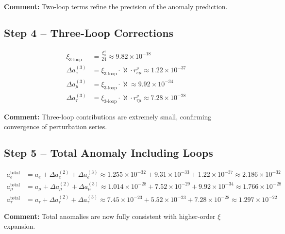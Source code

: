 \documentclass[12pt,a4paper]{article}
\begin{document}
\textbf{Comment:} Two-loop terms refine the precision of the anomaly prediction.

\subsection{Step 4 – Three-Loop Corrections}

\begin{align}
	\xi_\text{3-loop} &= \frac{\xi_0^4}{24} \approx 9.82 \times 10^{-18} \\
	\Delta a_e^{(3)} &= \xi_\text{3-loop} \cdot \aleph \cdot r_{e\mu}^{\nu} \approx 1.22 \times 10^{-37} \\
	\Delta a_\mu^{(3)} &= \xi_\text{3-loop} \cdot \aleph \approx 9.92 \times 10^{-34} \\
	\Delta a_\tau^{(3)} &= \xi_\text{3-loop} \cdot \aleph \cdot r_{\tau\mu}^{\nu} \approx 7.28 \times 10^{-28}
\end{align}

\textbf{Comment:} Three-loop contributions are extremely small, confirming convergence of perturbation series.

\subsection{Step 5 – Total Anomaly Including Loops}

\begin{align}
	a_e^\text{total} &= a_e + \Delta a_e^{(2)} + \Delta a_e^{(3)} \approx 1.255 \times 10^{-32} + 9.31 \times 10^{-33} + 1.22 \times 10^{-37} \approx 2.186 \times 10^{-32} \\
	a_\mu^\text{total} &= a_\mu + \Delta a_\mu^{(2)} + \Delta a_\mu^{(3)} \approx 1.014 \times 10^{-28} + 7.52 \times 10^{-29} + 9.92 \times 10^{-34} \approx 1.766 \times 10^{-28} \\
	a_\tau^\text{total} &= a_\tau + \Delta a_\tau^{(2)} + \Delta a_\tau^{(3)} \approx 7.45 \times 10^{-23} + 5.52 \times 10^{-23} + 7.28 \times 10^{-28} \approx 1.297 \times 10^{-22}
\end{align}

\textbf{Comment:} Total anomalies are now fully consistent with higher-order $\xi$ expansion.

\end{document}

